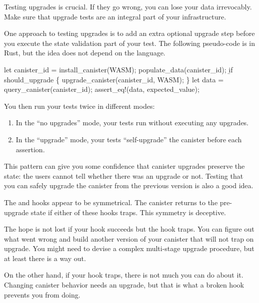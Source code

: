 \documentclass{article}
\begin{document}

Testing upgrades is crucial.
If they go wrong, you can lose your data irrevocably.
Make sure that upgrade tests are an integral part of your infrastructure.

One approach to testing upgrades is to add an extra optional upgrade step before you execute the state validation part of your test.
The following pseudo-code is in Rust, but the idea does not depend on the language.

\begin{code}[good]
let canister_id = install_canister(WASM);
populate_data(canister_id);
\b{if should_upgrade \{ upgrade_canister(canister_id, WASM); \}}
let data = query_canister(canister_id);
assert_eq!(data, expected_value);
\end{code}

You then run your tests twice in different modes:

\begin{enumerate}
\item In the ``no upgrades'' mode, your tests run without executing any upgrades.
\item In the ``upgrade'' mode, your tests ``self-upgrade'' the canister before each assertion.
\end{enumerate}

This pattern can give you some confidence that canister upgrades preserve the state: the users cannot tell whether there was an upgrade or not.
Testing that you can safely upgrade the canister from the previous version is also a good idea.


The  and  hooks appear to be symmetrical.
The canister returns to the pre-upgrade state if either of these hooks traps.
This symmetry is deceptive.

The hope is not lost if your  hook succeeds but the  hook traps.
You can figure out what went wrong and build another version of your canister that will not trap on upgrade.
You might need to devise a complex multi-stage upgrade procedure, but at least there is a way out.

On the other hand, if your  hook traps, there is not much you can do about it.
Changing canister behavior needs an upgrade, but that is what a broken  hook prevents you from doing.
\end{document}
